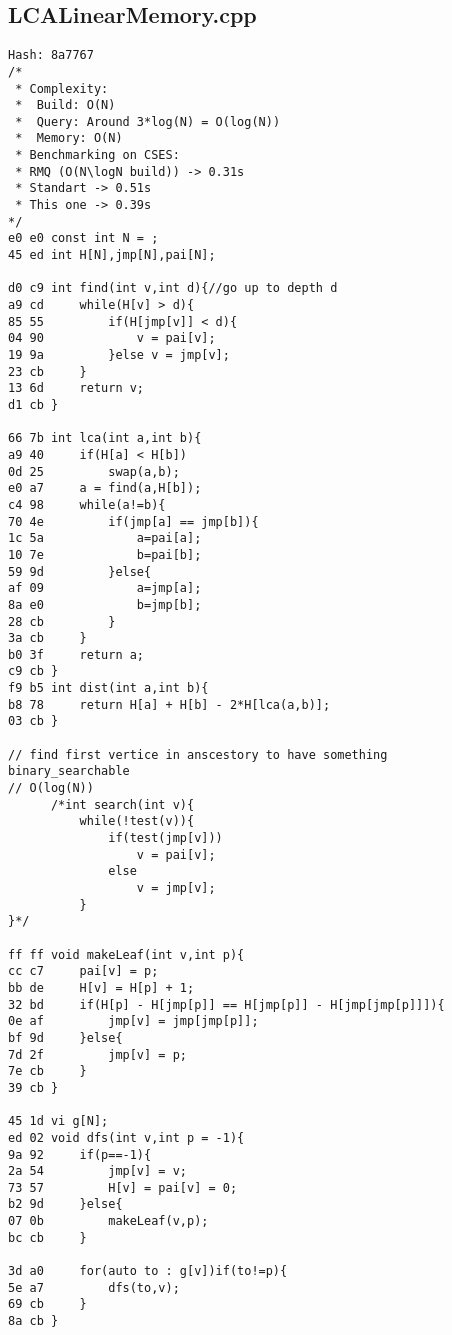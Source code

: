 \documentclass[11pt, a4paper, twoside]{article}
\begin{document}
\subsection{LCALinearMemory.cpp}
\begin{lstlisting}
Hash: 8a7767
/*
 * Complexity:
 *  Build: O(N)
 *  Query: Around 3*log(N) = O(log(N))
 *  Memory: O(N)
 * Benchmarking on CSES:
 * RMQ (O(N\logN build)) -> 0.31s
 * Standart -> 0.51s
 * This one -> 0.39s
*/
e0 e0 const int N = ;
45 ed int H[N],jmp[N],pai[N];

d0 c9 int find(int v,int d){//go up to depth d
a9 cd     while(H[v] > d){
85 55         if(H[jmp[v]] < d){
04 90             v = pai[v];
19 9a         }else v = jmp[v];
23 cb     }
13 6d     return v;
d1 cb }

66 7b int lca(int a,int b){
a9 40     if(H[a] < H[b])
0d 25         swap(a,b);
e0 a7     a = find(a,H[b]);
c4 98     while(a!=b){
70 4e         if(jmp[a] == jmp[b]){
1c 5a             a=pai[a];
10 7e             b=pai[b];
59 9d         }else{
af 09             a=jmp[a];
8a e0             b=jmp[b];
28 cb         }
3a cb     }
b0 3f     return a;
c9 cb }
f9 b5 int dist(int a,int b){
b8 78     return H[a] + H[b] - 2*H[lca(a,b)];
03 cb }

// find first vertice in anscestory to have something binary_searchable
// O(log(N))
      /*int search(int v){ 
          while(!test(v)){
              if(test(jmp[v]))
                  v = pai[v];
              else
                  v = jmp[v];
          }
}*/

ff ff void makeLeaf(int v,int p){
cc c7     pai[v] = p;
bb de     H[v] = H[p] + 1;
32 bd     if(H[p] - H[jmp[p]] == H[jmp[p]] - H[jmp[jmp[p]]]){
0e af         jmp[v] = jmp[jmp[p]];
bf 9d     }else{
7d 2f         jmp[v] = p;
7e cb     }
39 cb }

45 1d vi g[N];
ed 02 void dfs(int v,int p = -1){
9a 92     if(p==-1){
2a 54         jmp[v] = v;
73 57         H[v] = pai[v] = 0;
b2 9d     }else{
07 0b         makeLeaf(v,p);
bc cb     }
      
3d a0     for(auto to : g[v])if(to!=p){
5e a7         dfs(to,v);
69 cb     }
8a cb }
\end{lstlisting}
\end{document}
